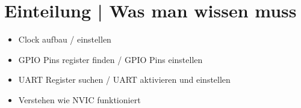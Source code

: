 \newpage
\section{Einteilung | Was man wissen muss}
    \begin{itemize}
        \item Clock aufbau / einstellen
        \item GPIO Pins register finden / GPIO Pins einstellen 
        \item UART Register suchen / UART aktivieren und einstellen
        \item Verstehen wie NVIC funktioniert
    \end{itemize}
